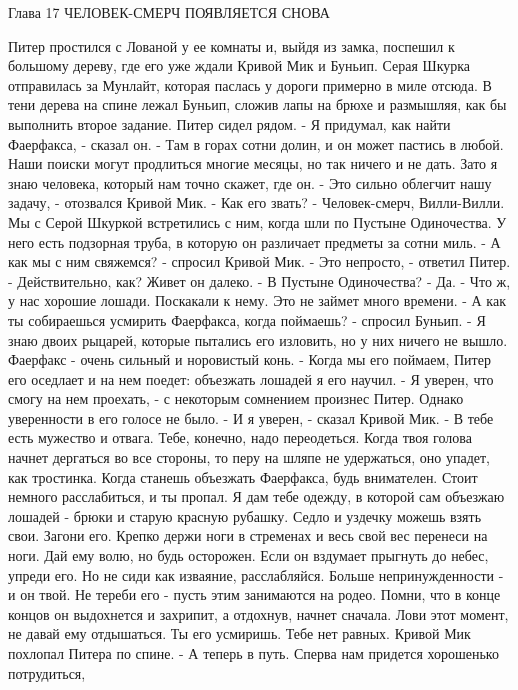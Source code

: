 Глава 17
        ЧЕЛОВЕК-СМЕРЧ ПОЯВЛЯЕТСЯ СНОВА

    Питер простился с Лованой у ее комнаты и, выйдя из замка, поспешил 
к большому дереву, где его уже ждали Кривой Мик и Буньип. Серая Шкурка 
отправилась за Мунлайт, которая паслась у дороги примерно в миле 
отсюда.
    В тени дерева на спине лежал Буньип, сложив лапы на брюхе и 
размышляя, как бы выполнить второе задание.
    Питер сидел рядом.
    - Я придумал, как найти Фаерфакса, - сказал он. - Там в горах 
сотни долин, и он может пастись в любой. Наши поиски могут продлиться 
многие месяцы, но так ничего и не дать. Зато я знаю человека, который 
нам точно скажет, где он.
    - Это сильно облегчит нашу задачу, - отозвался Кривой Мик. - Как 
его звать?
    - Человек-смерч, Вилли-Вилли. Мы с Серой Шкуркой встретились с 
ним, когда шли по Пустыне Одиночества. У него есть подзорная труба, в 
которую он различает предметы за сотни миль.
    - А как мы с ним свяжемся? - спросил Кривой Мик.
    - Это непросто, - ответил Питер. - Действительно, как? Живет он 
далеко.
    - В Пустыне Одиночества?
    - Да.
    - Что ж, у нас хорошие лошади. Поскакали к нему. Это не займет 
много времени.
    - А как ты собираешься усмирить Фаерфакса, когда поймаешь? - 
спросил Буньип. - Я знаю двоих рыцарей, которые пытались его изловить, 
но у них ничего не вышло. Фаерфакс - очень сильный и норовистый конь.
    - Когда мы его поймаем, Питер его оседлает и на нем поедет: 
объезжать лошадей я его научил.
    - Я уверен, что смогу на нем проехать, - с некоторым сомнением 
произнес Питер. Однако уверенности в его голосе не было.
    - И я уверен, - сказал Кривой Мик. - В тебе есть мужество и 
отвага. Тебе, конечно, надо переодеться. Когда твоя голова начнет 
дергаться во все стороны, то перу на шляпе не удержаться, оно упадет, 
как тростинка. Когда станешь объезжать Фаерфакса, будь внимателен. 
Стоит немного расслабиться, и ты пропал. Я дам тебе одежду, в которой 
сам объезжаю лошадей - брюки и старую красную рубашку. Седло и уздечку 
можешь взять свои. Загони его. Крепко держи ноги в стременах и весь 
свой вес перенеси на ноги. Дай ему волю, но будь осторожен. Если он 
вздумает прыгнуть до небес, упреди его. Но не сиди как изваяние, 
расслабляйся. Больше непринужденности - и он твой. Не тереби его - 
пусть этим занимаются на родео. Помни, что в конце концов он 
выдохнется и захрипит, а отдохнув, начнет сначала. Лови этот момент, 
не давай ему отдышаться. Ты его усмиришь. Тебе нет равных.
    Кривой Мик похлопал Питера по спине.
    - А теперь в путь. Сперва нам придется хорошенько потрудиться, 
